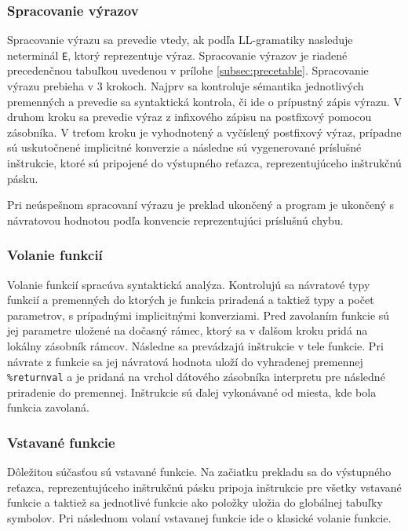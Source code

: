 \documentclass[a4paper, 12pt]{article}
\begin{document}
\subsubsection{Spracovanie výrazov}

Spracovanie výrazu sa prevedie vtedy, ak podľa LL-gramatiky nasleduje neterminál \texttt{E}, ktorý reprezentuje výraz. Spracovanie výrazov je riadené precedenčnou tabuľkou uvedenou v prílohe \ref{subsec:precetable}.
Spracovanie výrazu prebieha v 3 krokoch. Najprv sa kontroluje sémantika jednotlivých premenných a prevedie sa syntaktická kontrola, či ide o prípustný zápis výrazu. V druhom kroku sa prevedie výraz z infixového zápisu na postfixový pomocou zásobníka. V treťom kroku je vyhodnotený a vyčíslený postfixový výraz, prípadne sú uskutočnené implicitné konverzie a následne sú vygenerované príslušné inštrukcie, ktoré sú pripojené do výstupného reťazca, reprezentujúceho inštrukčnú pásku.

Pri neúspešnom spracovaní výrazu je preklad ukončený a program je ukončený s návratovou hodnotou podľa konvencie reprezentujúci príslušnú chybu.

\subsubsection{Volanie funkcií}

Volanie funkcií spracúva syntaktická analýza. Kontrolujú sa návratové typy funkcií a premenných do ktorých je funkcia priradená a taktiež typy a počet parametrov, s prípadnými implicitnými konverziami. Pred zavolaním funkcie sú jej parametre uložené na dočasný rámec, ktorý sa v ďalšom kroku pridá na lokálny zásobník rámcov. Následne sa prevádzajú inštrukcie v tele funkcie. Pri návrate z funkcie sa jej návratová hodnota uloží do vyhradenej premennej \texttt{\%returnval} a je pridaná na vrchol dátového zásobníka interpretu pre následné priradenie do premennej. Inštrukcie sú ďalej vykonávané od miesta, kde bola funkcia zavolaná.

\subsubsection{Vstavané funkcie}
Dôležitou súčasťou sú vstavané funkcie. Na začiatku prekladu sa do výstupného reťazca, reprezentujúceho inštrukčnú pásku pripoja inštrukcie pre všetky vstavané funkcie a taktiež sa jednotlivé funkcie ako položky uložia do globálnej tabuľky symbolov. Pri následnom volaní vstavanej funkcie ide o klasické volanie funkcie. 
\end{document}
